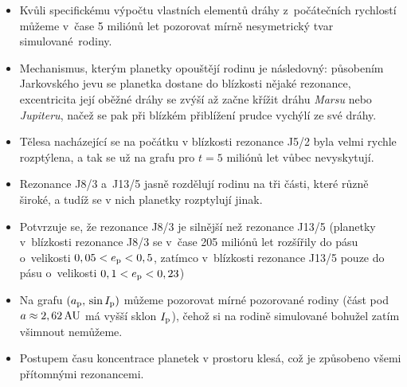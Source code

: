 \documentclass[a4paper, 12pt]{article}
\begin{document}
\begin{itemize}
\item 
Kvůli specifickému výpočtu vlastních elementů dráhy z~počátečních rychlostí můžeme v~čase 5 miliónů let pozorovat mírně nesymetrický tvar simulované~rodiny. 

\item Mechanismus, kterým planetky opouštějí rodinu je následovný: působením Jarkovského jevu se planetka dostane do blízkosti nějaké rezonance, excentricita její oběžné dráhy se zvýší až začne křížit dráhu \textit{Marsu} nebo \textit{Jupiteru}, načež se pak při blízkém přiblížení prudce vychýlí ze své dráhy.

\item 
Tělesa nacházející se na počátku v blízkosti rezonance J5/2 byla velmi rychle rozptýlena, a tak se už na grafu pro $t=5$ miliónů let vůbec nevyskytují.

\item
Rezonance J8/3 a~J13/5 jasně rozdělují rodinu na tři části, které různě široké, a tudíž se v nich planetky rozptylují jinak.

\item 
Potvrzuje se, že rezonance J8/3 je silnější než rezonance J13/5 (planetky v~blízkosti rezonance J8/3 se v~čase 205 miliónů let rozšířily do pásu o~velikosti $0,05<e_{\rm p}<0,5$, zatímco v~blízkosti rezonance J13/5 pouze do pásu o~velikosti $0,1<e_{\rm p}<0,23$)

\item
Na grafu $(a_{\rm p},\,\sin I_{\rm p})$ můžeme pozorovat mírné  pozorované rodiny (část pod $a\approx2,62\,{\rm AU}$ má vyšší sklon $I_{\rm p}$), čehož si na rodině simulované bohužel zatím všimnout nemůžeme.

\item Postupem času koncentrace planetek v prostoru klesá, což je způsobeno všemi přítomnými rezonancemi.


\end{itemize}
\end{document}
